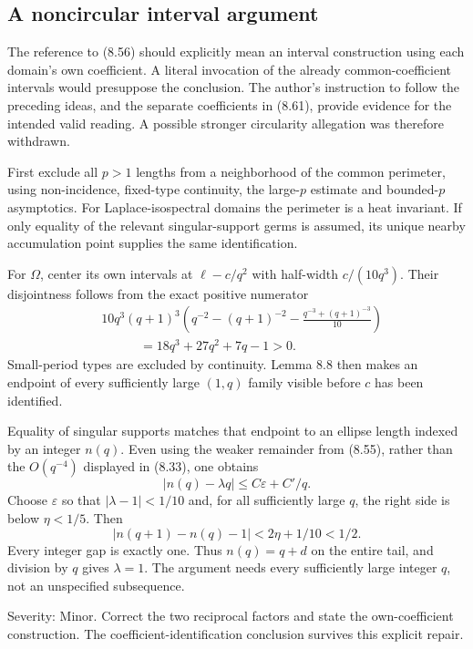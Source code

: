 \documentclass[10pt]{article}
\begin{document}
\subsection*{A noncircular interval argument}
The reference to (8.56) should explicitly mean an interval construction using each domain’s own coefficient. A literal invocation of the already common-coefficient intervals would presuppose the conclusion. The author’s instruction to follow the preceding ideas, and the separate coefficients in (8.61), provide evidence for the intended valid reading. A possible stronger circularity allegation was therefore withdrawn.\par
First exclude all \(p>1\) lengths from a neighborhood of the common perimeter, using non-incidence, fixed-type continuity, the large-\(p\) estimate and bounded-\(p\) asymptotics. For Laplace-isospectral domains the perimeter is a heat invariant. If only equality of the relevant singular-support germs is assumed, its unique nearby accumulation point supplies the same identification.\par
For \(\Omega\), center its own intervals at \(\ell-c/q^2\) with half-width \(c/(10q^3)\). Their disjointness follows from the exact positive numerator \[\begin{aligned}
 &10q^3(q+1)^3
 \left(q^{-2}-(q+1)^{-2}
       -\frac{q^{-3}+(q+1)^{-3}}{10}\right)\\
 &\hspace{3em}=18q^3+27q^2+7q-1>0 .\end{aligned}\] Small-period types are excluded by continuity. Lemma 8.8 then makes an endpoint of every sufficiently large \((1,q)\) family visible before \(c\) has been identified.\par
Equality of singular supports matches that endpoint to an ellipse length indexed by an integer \(n(q)\). Even using the weaker remainder from (8.55), rather than the \(O(q^{-4})\) displayed in (8.33), one obtains \[|n(q)-\lambda q|\leq C\varepsilon+C'/q .\] Choose \(\varepsilon\) so that \(|\lambda-1|<1/10\) and, for all sufficiently large \(q\), the right side is below \(\eta<1/5\). Then \[|n(q+1)-n(q)-1|<2\eta+1/10<1/2 .\] Every integer gap is exactly one. Thus \(n(q)=q+d\) on the entire tail, and division by \(q\) gives \(\lambda=1\). The argument needs every sufficiently large integer \(q\), not an unspecified subsequence.\par
Severity: Minor. Correct the two reciprocal factors and state the own-coefficient construction. The coefficient-identification conclusion survives this explicit repair.\par
\end{document}
